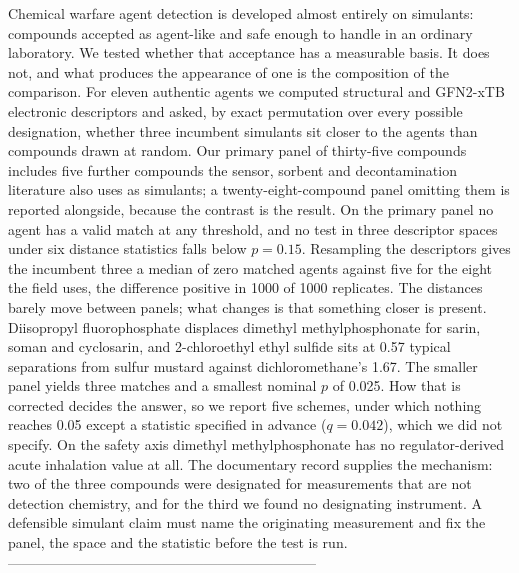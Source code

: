 %
Chemical warfare agent detection is developed almost entirely on simulants:
compounds accepted as agent-like and safe enough to handle in an ordinary
laboratory. We tested whether that acceptance has a measurable basis. It does
not, and what produces the appearance of one is the composition of the
comparison. For eleven authentic agents we computed structural and GFN2-xTB
electronic descriptors and asked, by exact permutation over every possible
designation, whether three incumbent simulants sit closer to the agents than
compounds drawn at random. Our primary panel of thirty-five compounds includes
five further compounds the sensor, sorbent and decontamination literature also
uses as simulants; a twenty-eight-compound panel omitting them is reported
alongside, because the contrast is the result. On the primary panel no agent has
a valid match at any threshold, and no test in three descriptor spaces under six
distance statistics falls below $p=0.15$. Resampling the descriptors gives the
incumbent three a median of zero matched agents against five for the eight the
field uses, the difference positive in 1000 of 1000 replicates. The distances
barely move between panels; what changes is that something closer is present.
Diisopropyl fluorophosphate displaces dimethyl methylphosphonate for sarin,
soman and cyclosarin, and 2-chloroethyl ethyl sulfide sits at 0.57 typical
separations from sulfur mustard against dichloromethane's 1.67. The smaller
panel yields three matches and a smallest nominal $p$ of 0.025. How that is
corrected decides the answer, so we report five schemes, under which nothing
reaches 0.05 except a statistic specified in advance ($q=0.042$), which we did
not specify. On the safety axis dimethyl methylphosphonate has no
regulator-derived acute inhalation value at all. The documentary record
supplies the mechanism: two of the three
compounds were designated for measurements that are not detection chemistry, and
for the third we found no designating instrument. A defensible simulant claim
must name the originating measurement and fix the panel, the space and the
statistic before the test is run.
------------------------------------------------------------------
